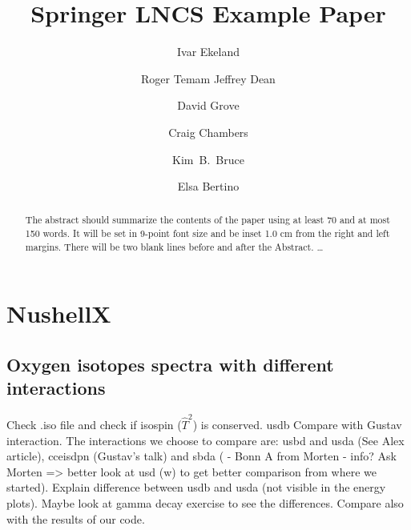 \documentclass{llncs}
\begin{document}
\title{Springer LNCS Example Paper}
%
%
\author{Ivar Ekeland \and Roger Temam
Jeffrey Dean \and David Grove \and Craig Chambers \and Kim~B.~Bruce \and
Elsa Bertino}
%
%
%

\maketitle              %

\begin{abstract}
The abstract should summarize the contents of the paper
using at least 70 and at most 150 words. It will be set in 9-point
font size and be inset 1.0 cm from the right and left margins.
There will be two blank lines before and after the Abstract. \dots
{}
\end{abstract}
%
\section{NushellX}
%
%
\subsection{Oxygen isotopes spectra with different interactions}
%
Check .iso file and check if isospin ($\hat{T}^2$) is conserved. usdb Compare with Gustav interaction.
The interactions we choose to compare are: usbd and usda (See Alex article), cceisdpn (Gustav's talk) and sbda ( - Bonn A from Morten - info? Ask Morten => better look at usd (w) to get better comparison from where we started).
Explain difference between usdb and usda (not visible in the energy plots). Maybe look at gamma decay exercise to see the differences.
Compare also with the results of our code.
\end{document}
